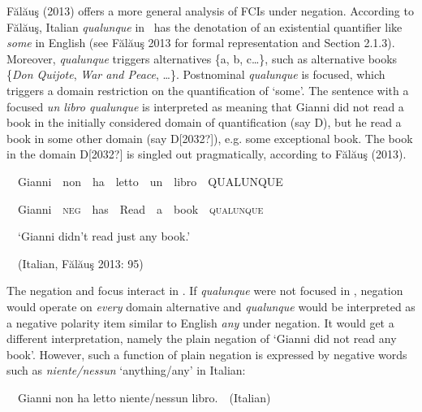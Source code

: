 \begin{styleStandard}
Fălăuş (2013) offers a more general analysis of FCIs under negation. According to Fălăuş, Italian \textit{qualunque} in \ has the denotation of an existential quantifier like \textit{some} in English (see Fălăuş 2013 for formal representation and Section 2.1.3). Moreover, \textit{qualunque} triggers alternatives \{a, b, c…\}, such as alternative books \{\textit{Don Quijote}, \textit{War and Peace}, …\}. Postnominal \textit{qualunque} is focused, which triggers a domain restriction on the quantification of ‘some’. The sentence with a focused \textit{un libro qualunque} is interpreted as meaning that Gianni did not read a book in the initially considered domain of quantification (say D), but he read a book in some other domain (say D[2032?]), e.g. some exceptional book. The book in the domain D[2032?] is singled out pragmatically, according to Fălăuş (2013).
\end{styleStandard}

\begin{styleStandard}
\label{bkm:Ref42805226}\ \ Gianni\ \ non\ \ ha\ \ letto\ \ un\ \ libro\ \ \MakeUppercase{qualunque}
\end{styleStandard}

\begin{styleStandard}
\ \ Gianni\ \ \textsc{neg}\ \ has\ \ Read\ \ a\ \ book\ \ \textsc{qualunque}
\end{styleStandard}

\begin{styleStandard}
\ \ ‘Gianni didn’t read just any book.’
\end{styleStandard}

\begin{styleStandard}
\ \ (Italian, Fălăuş 2013: 95)
\end{styleStandard}

\begin{styleStandard}
The negation and focus interact in . If \textit{qualunque} were not focused in , negation would operate on \textit{every} domain alternative and \textit{qualunque} would be interpreted as a negative polarity item similar to English \textit{any} under negation. It would get a different interpretation, namely the plain negation of ‘Gianni did not read any book’. However, such a function of plain negation is expressed by negative words such as \textit{niente/nessun} ‘anything/any’ in Italian:
\end{styleStandard}

\begin{styleStandard}
\ \ Gianni non ha letto niente/nessun libro.\ \ (Italian)
\end{styleStandard}

